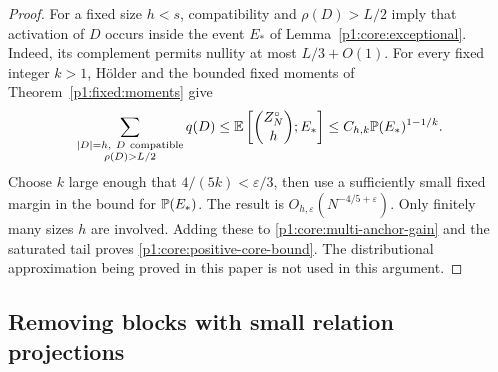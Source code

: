 \begin{proof}
For a fixed size $h<s$, compatibility and $\rho(D)>L/2$ imply that
activation of $D$ occurs inside the event $E_*$ of
Lemma~\ref{p1:core:exceptional}. Indeed, its complement permits
nullity at most $L/3+O(1)$. For every fixed integer $k>1$, H\"older
and the bounded fixed moments of Theorem~\ref{p1:fixed:moments} give
\[
 \sum_{\substack{|D|=h,\ D\ \mathrm{compatible}\\\rho(D)>L/2}}q(D)
 \le\E\left[\binom{Z_N^\circ}{h};E_*\right]
 \le C_{h,k}\P(E_*)^{1-1/k}.
\]
Choose $k$ large enough that $4/(5k)<\varepsilon/3$, then use a
sufficiently small fixed margin in the bound for $\P(E_*)$.
The result is $O_{h,\varepsilon}(N^{-4/5+\varepsilon})$.
Only finitely many sizes $h$ are involved. Adding these to
\eqref{p1:core:multi-anchor-gain} and the saturated tail proves
\eqref{p1:core:positive-core-bound}. The distributional approximation
being proved in this paper is not used in this argument.
\end{proof}

\subsection{Removing blocks with small relation projections}

